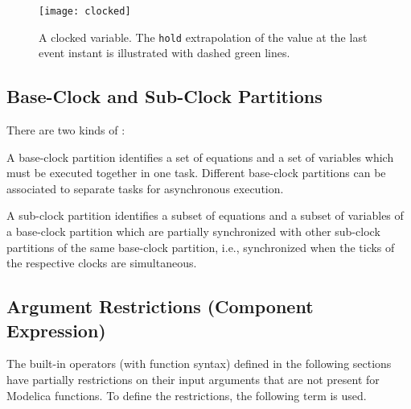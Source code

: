 \begin{figure}[H]
  \begin{center}
    \texttt{[image: clocked]}
  \end{center}
  \caption{A clocked variable.  The \lstinline!hold! extrapolation of the value at the last event instant is illustrated with dashed green lines.}\label{fig:clocked-variable}
\end{figure}

\subsection{Base-Clock and Sub-Clock Partitions}\label{base-clock-and-sub-clock-partitions}

There are two kinds of :

\begin{definition}
A base-clock partition identifies a set of equations and a set of variables which must be executed together in one task.  Different base-clock partitions can be associated to separate tasks for
asynchronous execution.
\end{definition}

\begin{definition}
A sub-clock partition identifies a subset of equations and a subset of variables of a base-clock partition which are partially synchronized with other sub-clock partitions of the same base-clock
partition, i.e., synchronized when the ticks of the respective clocks are simultaneous.
\end{definition}

\subsection{Argument Restrictions (Component Expression)}\label{argument-restrictions-component-expression}

The built-in operators (with function syntax) defined in the following
sections have partially restrictions on their input arguments that are
not present for Modelica functions. To define the restrictions, the
following term is used.

